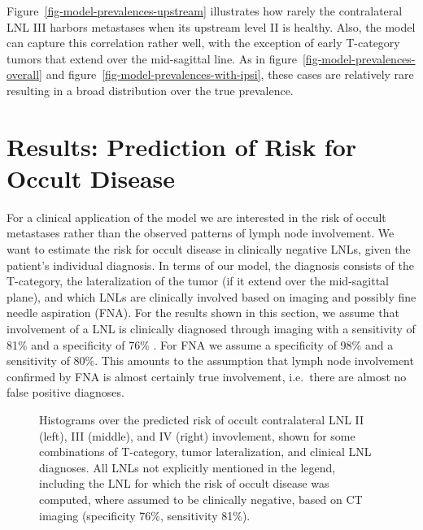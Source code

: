 \documentclass[
  sn-mathphys-num,
]{sn-jnl}
\begin{document}
Figure~\ref{fig-model-prevalences-upstream} illustrates how rarely the
contralateral LNL III harbors metastases when its upstream level II is
healthy. Also, the model can capture this correlation rather well, with
the exception of early T-category tumors that extend over the
mid-sagittal line. As in figure~\ref{fig-model-prevalences-overall} and
figure~\ref{fig-model-prevalences-with-ipsi}, these cases are relatively
rare resulting in a broad distribution over the true prevalence.

\section{Results: Prediction of Risk for Occult
Disease}\label{results-prediction-of-risk-for-occult-disease}

For a clinical application of the model we are interested in the risk of
occult metastases rather than the observed patterns of lymph node
involvement. We want to estimate the risk for occult disease in
clinically negative LNLs, given the patient's individual diagnosis. In
terms of our model, the diagnosis consists of the T-category, the
lateralization of the tumor (if it extend over the mid-sagittal plane),
and which LNLs are clinically involved based on imaging and possibly
fine needle aspiration (FNA). For the results shown in this section, we
assume that involvement of a LNL is clinically diagnosed through imaging
with a sensitivity of 81\% and a specificity of 76\%
\citep{de_bondt_detection_2007}. For FNA we assume a specificity of 98\%
and a sensitivity of 80\%. This amounts to the assumption that lymph
node involvement confirmed by FNA is almost certainly true involvement,
i.e.~there are almost no false positive diagnoses.

\begin{figure}


\caption{\label{fig-model-risks}Histograms over the predicted risk of
occult contralateral LNL II (left), III (middle), and IV (right)
invovlement, shown for some combinations of T-category, tumor
lateralization, and clinical LNL diagnoses. All LNLs not explicitly
mentioned in the legend, including the LNL for which the risk of occult
disease was computed, where assumed to be clinically negative, based on
CT imaging (specificity 76\%, sensitivity 81\%).}

\end{figure}%
\end{document}

